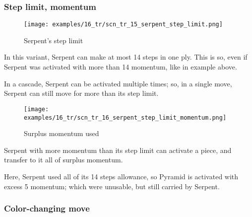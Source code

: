 \subsubsection*{Step limit, momentum}
\label{sec:Tamoanchan Revisited/Serpent/Movement/Step limit, momentum}

\vspace*{-1.2\baselineskip}
\noindent
\begin{figure}[!h]
\texttt{[image: examples/16\_tr/scn\_tr\_15\_serpent\_step\_limit.png]}
\caption{Serpent's step limit}
\label{fig:scn_tr_15_serpent_step_limit}
\end{figure}

In this variant, Serpent can make at most 14 steps in one ply. This is so,
even if Serpent was activated with more than 14 momentum, like in example
above.

In a cascade, Serpent can be activated multiple times; so, in a single move,
Serpent can still move for more than its step limit.

\clearpage %

\vspace*{-2.1\baselineskip}
\noindent
\begin{figure}[!h]
\texttt{[image: examples/16\_tr/scn\_tr\_16\_serpent\_step\_limit\_momentum.png]}
\caption{Surplus momentum used}
\label{fig:scn_tr_16_serpent_step_limit_momentum}
\end{figure}

Serpent with more momentum than its step limit can activate a piece, and
transfer to it all of surplus momentum.

Here, Serpent used all of its 14 steps allowance, so Pyramid is activated with
excess 5 momentum; which were unusable, but still carried by Serpent.

\clearpage %

\subsubsection*{Color-changing move}
\label{sec:Tamoanchan Revisited/Serpent/Movement/Color-changing move}

